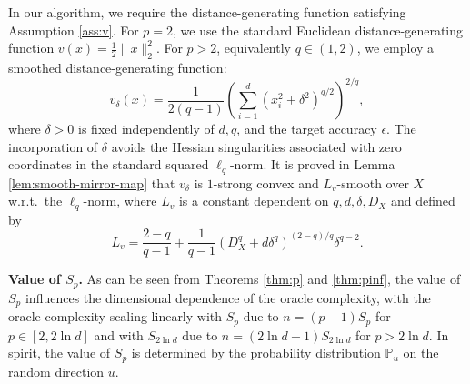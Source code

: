 \documentclass[11pt]{article}
\numberwithin{equation}{section}
\begin{document}
In  our algorithm, we require the distance-generating function satisfying Assumption \ref{ass:v}.  For \(p=2\), we use the standard Euclidean distance-generating function \( v(x) = \frac{1}{2} \|x\|_2^2 \). For \(p>2\), equivalently \(q\in(1,2)\), we employ a smoothed distance-generating function:
\begin{equation}\label{eq:smoothed_v}
v_\delta(x) = \frac{1}{2(q-1)} ( \sum_{i=1}^d (x_i^2 + \delta^2)^{q/2} )^{2/q},
\end{equation}
where \(\delta > 0\) is fixed independently of \(d,q\), and the target accuracy \(\epsilon\).
The incorporation of \(\delta\) avoids the Hessian singularities associated with zero coordinates in the standard squared \(\ell_q\)-norm. It is proved in Lemma  \ref{lem:smooth-mirror-map} that $v_\delta$ is  \(1\)-strong convex and $L_v$-smooth over $X$ w.r.t.\ the \( \ell_q \)-norm, where \(L_v\) is a constant dependent on \(q,d,\delta,D_X\) and defined by 
\begin{equation}\label{eq:Lv}
    L_{v}= \frac{2-q}{q-1} +
    \frac{1}{q-1}
    (D_X^q+d\delta^q)^{(2-q)/q}\delta^{q-2}.
\end{equation}

{\bf Value of $S_p$.} 
As can be seen from Theorems \ref{thm:p} and \ref{thm:pinf}, the value of \(S_p\) influences the dimensional dependence of the oracle complexity, with the oracle complexity scaling linearly with \(S_p\) due to \(n = (p-1)S_p\) for \(p \in [2, 2\ln d]\) and with \(S_{2 \ln d}\) due to \(n = (2 \ln d - 1)S_{2 \ln d}\) for \(p > 2 \ln d\). In spirit, the value of $S_p$ is determined by the probability distribution $\mathbb P_u$ on the random direction $u.$
\end{document}
